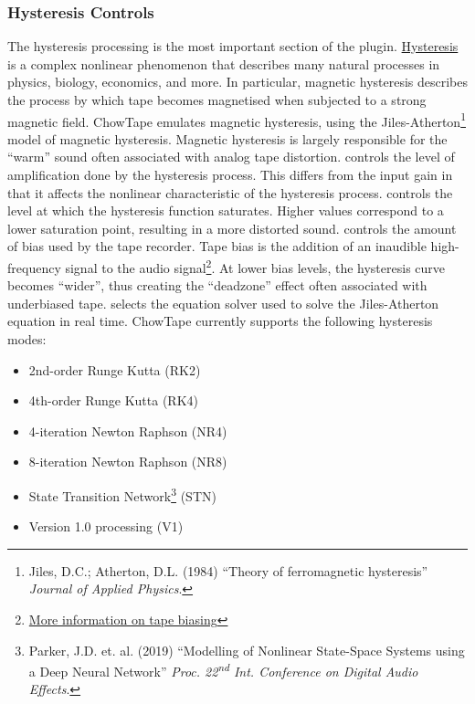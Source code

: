 \documentclass[landscape,twocolumn,a5paper]{manual}
\begin{document}
\subsubsection{Hysteresis Controls}
The hysteresis processing is the most important section of the
plugin. \href{https://en.wikipedia.org/wiki/Hysteresis}{Hysteresis}
is a complex nonlinear phenomenon that describes many
natural processes in physics, biology, economics, and more.
In particular, magnetic hysteresis describes the process by
which tape becomes magnetised when subjected to a strong magnetic
field. ChowTape emulates magnetic hysteresis, using the
Jiles-Atherton\footnote{Jiles, D.C.; Atherton, D.L. (1984) ``Theory of ferromagnetic hysteresis'' \textit{Journal of Applied Physics}.}
model of magnetic hysteresis. Magnetic hysteresis is largely
responsible for the ``warm'' sound often associated with
analog tape distortion.
\newpar
{} controls the level of amplification done by
the hysteresis process. This differs from the input gain in that
it affects the nonlinear characteristic of the hysteresis process.
\newpar
{} controls the level at which the hysteresis
function saturates. Higher values correspond to a lower saturation
point, resulting in a more distorted sound.
\newline
{} controls the amount of bias used by the tape
recorder. Tape bias is the addition of an inaudible high-frequency
signal to the audio signal\footnote{\href{https://hccc.org.uk/acbias.html}{More information on tape biasing}}.
At lower bias levels, the hysteresis curve becomes ``wider'',
thus creating the ``deadzone'' effect often associated with
underbiased tape.
\newpar
{} selects the equation solver used
to solve the Jiles-Atherton equation in real time. ChowTape
currently supports the following hysteresis modes:
\renewcommand{\labelitemi}{\textendash}
\begin{itemize}
    \itemsep-1mm
    \item 2nd-order Runge Kutta (RK2)
    \item 4th-order Runge Kutta (RK4)
    \item 4-iteration Newton Raphson (NR4)
    \item 8-iteration Newton Raphson (NR8)
    \item State Transition Network\footnote{Parker, J.D. et. al. (2019) ``Modelling of Nonlinear State-Space Systems using a Deep Neural Network'' \textit{Proc. 22\textsuperscript{nd} Int. Conference on Digital Audio Effects}.} (STN)
    \item Version 1.0 processing (V1)
\end{itemize}
\end{document}
